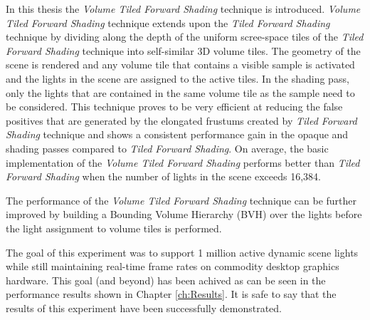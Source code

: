 In this thesis the \emph{Volume Tiled Forward Shading} technique is introduced. \emph{Volume Tiled Forward Shading} technique extends upon the \emph{Tiled Forward Shading} technique by dividing along the depth of the uniform scree-space tiles of the \emph{Tiled Forward Shading} technique into self-similar 3D volume tiles. The geometry of the scene is rendered and any volume tile that contains a visible sample is activated and the lights in the scene are assigned to the active tiles. In the shading pass, only the lights that are contained in the same volume tile as the sample need to be considered. This technique proves to be very efficient at reducing the false positives that are generated by the elongated frustums created by \emph{Tiled Forward Shading} technique and shows a consistent performance gain in the opaque and shading passes compared to \emph{Tiled Forward Shading}. On average, the basic implementation of the \emph{Volume Tiled Forward Shading} performs better than \emph{Tiled Forward Shading} when the number of lights in the scene exceeds 16,384.

The performance of the \emph{Volume Tiled Forward Shading} technique can be further improved by building a Bounding Volume Hierarchy (BVH) over the lights before the light assignment to volume tiles is performed.

The goal of this experiment was to support 1 million active dynamic scene lights while still maintaining real-time frame rates on commodity desktop graphics hardware. This goal (and beyond) has been achived as can be seen in the performance results shown in Chapter \ref{ch:Results}. It is safe to say that the results of this experiment have been successfully demonstrated.

